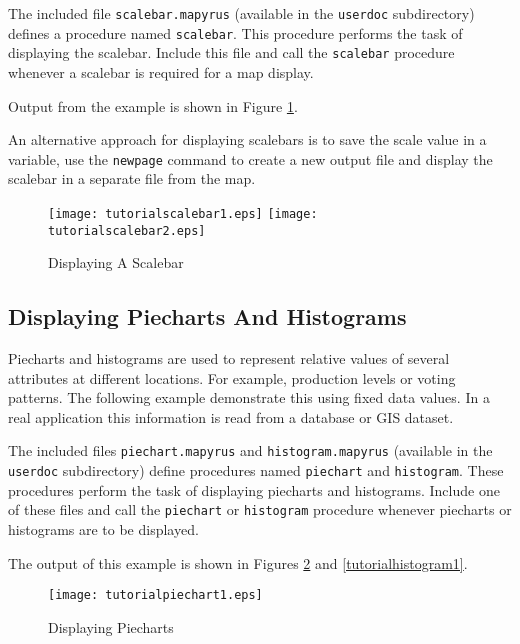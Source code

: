 The included file \texttt{scalebar.mapyrus} (available in the \texttt{userdoc}
subdirectory) defines a procedure named \texttt{scalebar}.  This procedure
performs the task of displaying the scalebar.  Include this file and call the
\texttt{scalebar} procedure whenever a scalebar is required for a map display.

Output from the example is shown in Figure \ref{tutorialscalebar1}.

An alternative approach for displaying scalebars is to save the scale value in
a variable, use the \texttt{newpage} command to create a new output file and
display the scalebar in a separate file from the map.



\begin{figure}[htb]
\texttt{[image: tutorialscalebar1.eps]}
\texttt{[image: tutorialscalebar2.eps]}
\caption{Displaying A Scalebar}
\label{tutorialscalebar1}
\end{figure}

\subsection{Displaying Piecharts And Histograms}

Piecharts and histograms
are used to represent relative values of several attributes at
different locations.  For example, production levels or voting patterns.  The
following example demonstrate this using fixed data values.
In a real application this information is read from a
database or GIS dataset.

The included files
\texttt{piechart.mapyrus}
and
\texttt{histogram.mapyrus}
(available in the \texttt{userdoc}
subdirectory) define procedures named
\texttt{piechart}
and
\texttt{histogram}.
These procedures
perform the task of displaying piecharts and histograms.
Include one of these files and call the
\texttt{piechart}
or
\texttt{histogram}
procedure whenever piecharts or histograms are to be displayed.

The output of this example is shown in Figures
\ref{tutorialpiechart1}
and
\ref{tutorialhistogram1}.



\begin{figure}[htb]
\texttt{[image: tutorialpiechart1.eps]}
\caption{Displaying Piecharts}
\label{tutorialpiechart1}
\end{figure}


